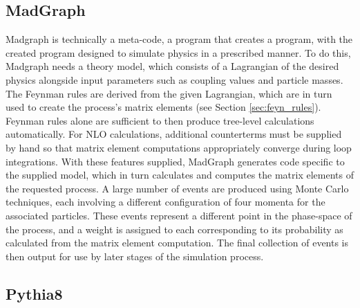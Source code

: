     \subsection{MadGraph}

    Madgraph is technically a meta-code, a program that creates a program,
        with the created program designed to simulate physics in a prescribed manner.
    To do this, Madgraph needs a theory model, which consists of a Lagrangian of the desired physics
        alongside input parameters such as coupling values and particle masses.
    The Feynman rules are derived from the given Lagrangian,
        which are in turn used to create the process's matrix elements (see Section \ref{sec:feyn_rules}).
    Feynman rules alone are sufficient to then produce tree-level calculations automatically.
    For NLO calculations, additional counterterms must be supplied by hand
        so that matrix element computations appropriately converge during loop integrations. 
    With these features supplied, MadGraph generates code specific to the supplied model,
        which in turn calculates and computes the matrix elements of the requested process\cite{madgraph}.
    A large number of events are produced using Monte Carlo techniques,
        each involving a different configuration of four momenta for the associated particles.
    These events represent a different point in the phase-space of the process,
        and a weight is assigned to each corresponding to its probability as calculated from the matrix element computation.
    The final collection of events is then output for use by later stages of the simulation process.

    \subsection{Pythia8}

